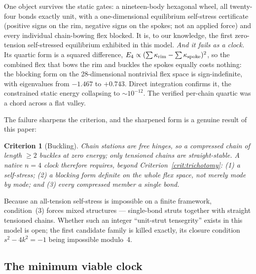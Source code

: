 \documentclass[11pt,a4paper]{article}
\theoremstyle{definition}
\theoremstyle{plain}
\newtheorem{criterion}{Criterion}
\theoremstyle{remark}
\begin{document}
One object survives the static gates: a nineteen-body hexagonal wheel,
all twenty-four bonds exactly unit, with a one-dimensional equilibrium
self-stress certificate (positive signs on the rim, negative signs on the
spokes; not an applied force) and every individual chain-bowing
flex blocked. It is, to our knowledge, the first zero-tension
self-stressed equilibrium exhibited in this model. \emph{And it fails as
a clock.} Its quartic form is a squared difference,
$E_4 \propto (\sum\kappa_{\rm rim} - \sum\kappa_{\rm spoke})^2$, so the
combined flex that bows the rim and buckles the spokes equally costs
nothing: the blocking form on the 28-dimensional nontrivial flex space is
sign-indefinite, with eigenvalues from $-1.467$ to $+0.743$. Direct
integration confirms it, the constrained static energy collapsing to
$\sim10^{-12}$. The verified per-chain quartic was a chord across a flat
valley.

The failure sharpens the criterion, and the sharpened form is a genuine
result of this paper:

\begin{criterion}[Buckling]
\label{crit:buckling}
Chain stations are free hinges, so a \emph{compressed} chain of length
$\ge 2$ buckles at zero energy; only tensioned chains are
straight-stable. A native $n=4$ clock therefore requires, beyond
Criterion~\ref{crit:trichotomy}: \textup{(1)} a self-stress;
\textup{(2)} a blocking form definite on the \emph{whole} flex space, not
merely mode by mode; and \textup{(3)} every compressed member a
\emph{single bond}.
\end{criterion}

Because an all-tension self-stress is impossible on a finite framework,
condition~(3) forces mixed structures --- single-bond struts together
with straight tensioned chains. Whether such an integer ``unit-strut
tensegrity'' exists in this model is open; the first candidate family is
killed exactly, its closure condition $s^2-4k^2=-1$ being impossible
modulo~4.

\subsection{The minimum viable clock}
\label{sec:mvc}
\end{document}
